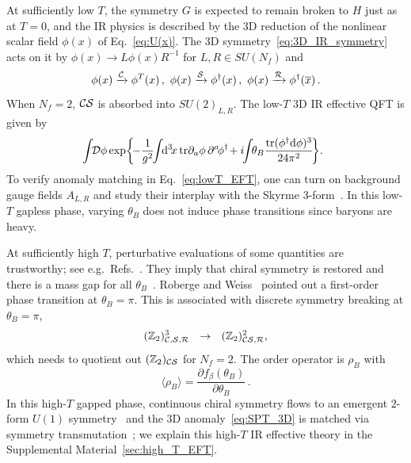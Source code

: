 \documentclass[
 reprint,







nofootinbib,


 amsmath,amssymb,
 aps,
 prd






tightenlines
]{revtex4-2}
\begin{document}
At sufficiently low $T$, the symmetry $G$ is expected to remain broken to
$H$ just as at $T=0$, and the IR physics is described by the 3D
reduction of the nonlinear scalar field $\phi(x)$ of
Eq.~\eqref{eq:U(x)}.
The 3D symmetry~\eqref{eq:3D_IR_symmetry} acts on it by $\phi(x)\to L\phi(x)R^{-1}$ for $L,R\in SU(N_f)$ and
\begin{equation}
    \phi(x) \xrightarrow{\mathcal{C}} \phi^T(x)\,,\
    \phi(x) \xrightarrow{\mathcal{S}} \phi^{\dag}(x)\,,\
    \phi(x) \xrightarrow{\mathcal{R}} \phi^{\dag}(\overline{x})\,.
\end{equation}
When $N_f=2$, $\mathcal{C}\mathcal{S}$ is absorbed into $SU(2)_{L,R}$.
The low-$T$ 3D IR effective QFT is given by~\cite{Xu:2011sj,Yonekura:2019vyz}
\begin{equation}\label{eq:lowT_EFT}
\begin{gathered}
    \!\!\!\int\!\!\calD \phi\exp\!\left\{\!-\frac{1}{g^2}\!\!\int\!\!\d^3\!x\,\tr \partial_{a}\phi\, \partial^{a}\!\phi^{\dagger}\! + i\!\!\int\!\!\theta_B\frac{\tr(\phi^{\dagger}\d \phi)^3}{24\pi^2} \!\right\}\!.
\end{gathered}
\end{equation}
To verify anomaly matching in Eq.~\eqref{eq:lowT_EFT}, one can turn on background
gauge fields $A_{L,R}$ and study their interplay with the Skyrme 3-form~\cite{Witten:1983tw,Xu:2011sj,Yonekura:2019vyz}.
In this low-$T$ gapless phase, varying $\theta_B$ does not induce
phase transitions since baryons are heavy.

At sufficiently high $T$, perturbative evaluations of some quantities
are trustworthy; see e.g.~Refs.~\cite{Gross:1980br,KapustaGale201102}.
They imply that chiral symmetry is restored and there is a mass gap for
all $\theta_B$~\cite{Roberge:1986mm}. Roberge
and Weiss~\cite{Roberge:1986mm} pointed out a first-order phase transition at $\theta_B=\pi$.
This is associated with discrete symmetry breaking at $\theta_B=\pi$,
\begin{equation}
\label{eq:broken_Z2}
    (\Z_2)^3_{\calC,\calS,\calR} \ \ \to\ \ (\Z_2)^2_{\calC\calS,\calR},
\end{equation}
which needs to quotient out $(\mathbb{Z}_2)_{\mathcal{C}\mathcal{S}}$ for $N_f=2$.
The order operator is $\rho_B$ with
\begin{equation}
    \langle\rho_B\rangle = \frac{\partial f_{\beta}(\theta_B)}{\partial\theta_B}\,.
\end{equation}
In this high-$T$ gapped phase, continuous chiral symmetry flows to an emergent $2$-form $U(1)$ symmetry~\cite{Gaiotto:2014kfa} and the 3D anomaly~\eqref{eq:SPT_3D} is matched via symmetry transmutation~\cite{Seiberg:2025bqy}; we explain this high-$T$ IR effective theory in the Supplemental Material~\ref{sec:high_T_EFT}.
\end{document}
